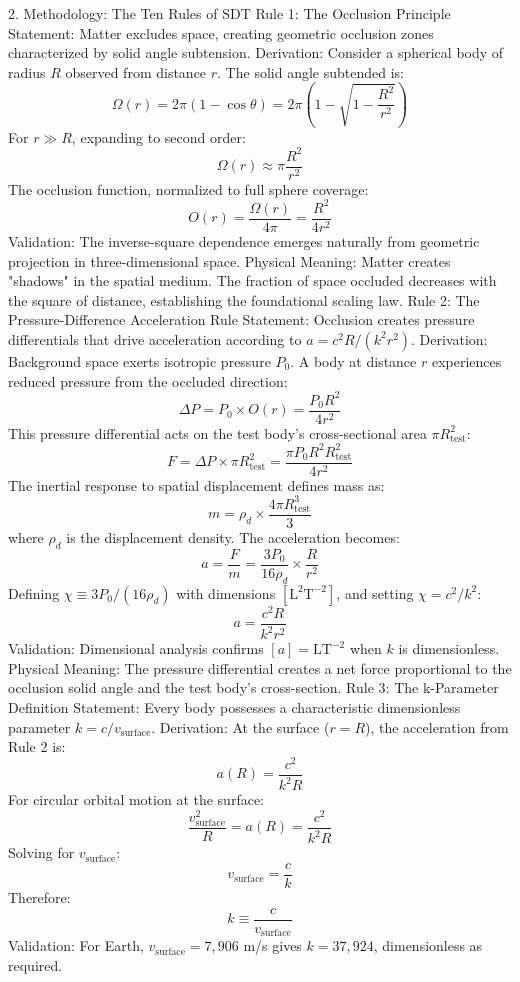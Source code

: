 2. Methodology: The Ten Rules of SDT
Rule 1: The Occlusion Principle
Statement: Matter excludes space, creating geometric occlusion zones characterized by solid angle subtension.
Derivation: Consider a spherical body of radius $R$ observed from distance $r$. The solid angle subtended is:
$$\Omega(r) = 2\pi\left(1 - \cos\theta\right) = 2\pi\left(1 - \sqrt{1 - \frac{R^2}{r^2}}\right)$$
For $r \gg R$, expanding to second order:
$$\Omega(r) \approx \pi\frac{R^2}{r^2}$$
The occlusion function, normalized to full sphere coverage:
$$O(r) = \frac{\Omega(r)}{4\pi} = \frac{R^2}{4r^2}$$
Validation: The inverse-square dependence emerges naturally from geometric projection in three-dimensional space.
Physical Meaning: Matter creates "shadows" in the spatial medium. The fraction of space occluded decreases with the square of distance, establishing the foundational scaling law.
Rule 2: The Pressure-Difference Acceleration Rule
Statement: Occlusion creates pressure differentials that drive acceleration according to $a = c^2R/(k^2r^2)$.
Derivation: Background space exerts isotropic pressure $P_0$. A body at distance $r$ experiences reduced pressure from the occluded direction:
$$\Delta P = P_0 \times O(r) = \frac{P_0R^2}{4r^2}$$
This pressure differential acts on the test body's cross-sectional area $\pi R_{\text{test}}^2$:
$$F = \Delta P \times \pi R_{\text{test}}^2 = \frac{\pi P_0 R^2 R_{\text{test}}^2}{4r^2}$$
The inertial response to spatial displacement defines mass as:
$$m = \rho_d \times \frac{4\pi R_{\text{test}}^3}{3}$$
where $\rho_d$ is the displacement density. The acceleration becomes:
$$a = \frac{F}{m} = \frac{3P_0}{16\rho_d} \times \frac{R}{r^2}$$
Defining $\chi \equiv 3P_0/(16\rho_d)$ with dimensions $[\text{L}^2\text{T}^{-2}]$, and setting $\chi = c^2/k^2$:
$$a = \frac{c^2R}{k^2r^2}$$
Validation: Dimensional analysis confirms $[a] = \text{LT}^{-2}$ when $k$ is dimensionless.
Physical Meaning: The pressure differential creates a net force proportional to the occlusion solid angle and the test body's cross-section.
Rule 3: The k-Parameter Definition
Statement: Every body possesses a characteristic dimensionless parameter $k = c/v_{\text{surface}}$.
Derivation: At the surface ($r = R$), the acceleration from Rule 2 is:
$$a(R) = \frac{c^2}{k^2R}$$
For circular orbital motion at the surface:
$$\frac{v_{\text{surface}}^2}{R} = a(R) = \frac{c^2}{k^2R}$$
Solving for $v_{\text{surface}}$:
$$v_{\text{surface}} = \frac{c}{k}$$
Therefore:
$$k \equiv \frac{c}{v_{\text{surface}}}$$
Validation: For Earth, $v_{\text{surface}} = 7,906$ m/s gives $k = 37,924$, dimensionless as required.
